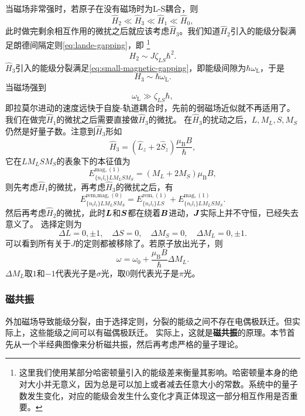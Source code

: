 \documentclass[UTF8, a4paper]{ctexart}
\begin{document}
当磁场非常强时，若原子在没有磁场时为L-S耦合，则
\begin{equation}
    \hat{H}_2 \ll \hat{H}_3 \ll \hat{H}_1 \ll \hat{H}_0,
\end{equation}
此时做完剩余相互作用的微扰之后就应该考虑$\hat{H}_3$。我们知道$\hat{H}_2$引入的能级分裂满足朗德间隔定则\eqref{eq:lande-gapping}，即%
\footnote{这里我们使用某部分哈密顿量引入的能级差来衡量其影响。哈密顿量本身的绝对大小并无意义，因为总是可以加上或者减去任意大小的常数。系统中的量子数发生变化，对应的能级会发生什么变化才真正体现这一部分相互作用是否重要。}%
\[
    H_2 \sim J \zeta_{LS} \hbar^2.
\]
$\hat{H}_3$引入的能级分裂满足\eqref{eq:small-magnetic-gapping}，即能级间隙为$\hbar \omega_\text{L}$，于是
\[
    H_3 \sim \hbar \omega_\text{L}.
\]
当磁场强到
\begin{equation}
    \omega_\text{L} \gg \zeta_{LS} \hbar,
\end{equation}
即拉莫尔进动的速度远快于自旋-轨道耦合时，先前的弱磁场近似就不再适用了。
我们在做完$\hat{H}_1$的微扰之后需要直接做$\hat{H}_3$的微扰。
在$\hat{H}_3$的扰动之后，$L, M_L, S, M_S$仍然是好量子数。注意到$\hat{H}_3$形如
\[
    \hat{H}_3 = (\hat{L}_z + 2 \hat{S}_z) \frac{\mu_\text{B} B}{\hbar}, 
\]
它在$L M_L S M_S$的表象下的本征值为
\begin{equation}
    E^{\text{mag}, (1)}_{\{n_i l_i\} L M_L S M_S} = (M_L + 2 M_S) \mu_\text{B} B,
\end{equation}
则先考虑$\hat{H}_1$的微扰，再考虑$\hat{H}_3$的微扰之后，有
\[
    E^{\text{rem,mag}, (0)}_{\{n_i l_i\} L M_L S M_S} = E^{\text{rem}, (1)}_{\{n_i l_i\} LS} + E^{\text{mag}, (1)}_{\{n_i l_i\} L M_L S M_S}.
\]
然后再考虑$\hat{H}_2$的微扰，此时$\vb*{L}$和$\vb*{S}$都在绕着$\vb*{B}$进动，$\vb*{J}$实际上并不守恒，已经失去意义了。
选择定则为
\begin{equation}
    \Delta L = 0, \pm 1, \quad \Delta S = 0, \quad \Delta M_S = 0, \quad \Delta M_L = 0, \pm 1.
\end{equation}
可以看到所有关于$J$的定则都被移除了。若原子放出光子，则
\begin{equation}
    \omega = \omega_0 + \frac{\mu_\text{B} B}{\hbar} \Delta M_L.
\end{equation}
$\Delta M_L$取$1$和$-1$代表光子是$\sigma$光，取$0$则代表光子是$\pi$光。

\subsubsection{磁共振}

外加磁场导致能级分裂，由于选择定则，分裂的能级之间不存在电偶极跃迁。但实际上，这些能级之间可以有磁偶极跃迁。
实际上，这就是\textbf{磁共振}的原理。本节首先从一个半经典图像来分析磁共振，然后再考虑严格的量子理论。
\end{document}
